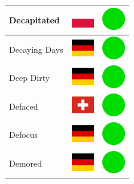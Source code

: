 \documentclass[12pt, a4paper, twoside]{report}
\begin{document}
\begin{center}
\begin{longtable}{|p{5cm}|p{2cm}|p{2cm}|}
Decapitated & \includegraphics[width=1cm]{4x3/pl} & \includegraphics[width=1cm]{likes/y} \\ \hline
Decaying Days & \includegraphics[width=1cm]{4x3/de} & \includegraphics[width=1cm]{likes/y} \\ \hline
Deep Dirty & \includegraphics[width=1cm]{4x3/de} & \includegraphics[width=1cm]{likes/y} \\ \hline
Defaced & \includegraphics[width=1cm]{4x3/ch} & \includegraphics[width=1cm]{likes/y} \\ \hline
Defocus & \includegraphics[width=1cm]{4x3/de} & \includegraphics[width=1cm]{likes/y} \\ \hline
Demored & \includegraphics[width=1cm]{4x3/de} & \includegraphics[width=1cm]{likes/y} \\ \hline

\end{longtable}
\end{center}
\end{document}
